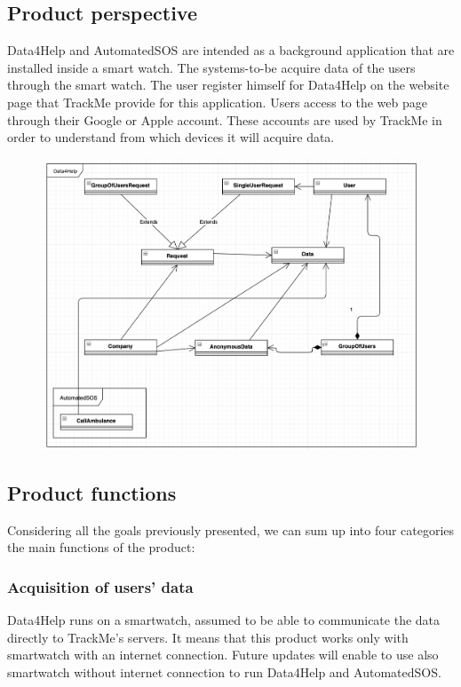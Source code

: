 \documentclass{article}
\begin{document}
\subsection{Product perspective}
Data4Help and AutomatedSOS are intended as a background application that are installed inside a smart watch. The systems-to-be acquire data of the users through the smart watch. The user register himself for Data4Help on the website page that TrackMe provide for this application. Users access to the web page through their Google or Apple account. These accounts are used by TrackMe in order to understand from which devices it will acquire data.
\begin{figure}[h!]
\centering
    \textbf{}\par\medskip
	\includegraphics[width= \linewidth]{uml.png}
\end{figure}
\subsection{Product functions}
Considering all the goals previously presented, we can sum up into four categories the main functions of the product:
\subsubsection{Acquisition of users' data}
Data4Help runs on a smartwatch, assumed to be able to communicate the data directly to TrackMe's servers. It means that this product works only with smartwatch with an internet connection. Future updates will enable to use also smartwatch without internet connection to run Data4Help and AutomatedSOS.
\end{document}
